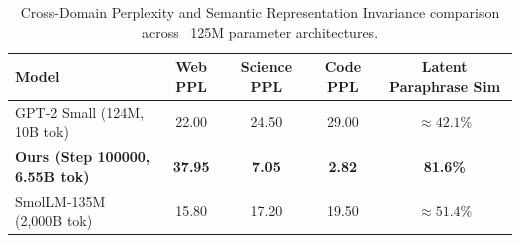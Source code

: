 \begin{table}[h]
\centering
\begin{tabular}{lcccc}
\hline
Model & Web PPL & Science PPL & Code PPL & Latent Paraphrase Sim \\ \hline
GPT-2 Small (124M, 10B tok) & 22.00 & 24.50 & 29.00 & $\approx 42.1\%$ \\
\textbf{Ours (Step 100000, 6.55B tok)} & \textbf{37.95} & \textbf{7.05} & \textbf{2.82} & \textbf{81.6\%} \\
SmolLM-135M (2,000B tok) & 15.80 & 17.20 & 19.50 & $\approx 51.4\%$ \\
\hline
\end{tabular}
\caption{Cross-Domain Perplexity and Semantic Representation Invariance comparison across ~125M parameter architectures.}
\label{tab:main_results}
\end{table}
